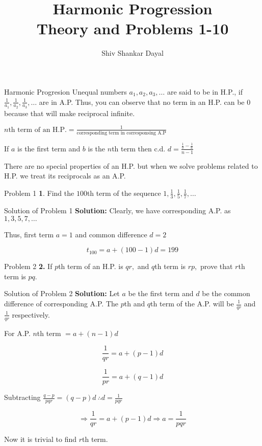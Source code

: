 \documentclass[aspectratio=1610,8pt]{beamer}
\title{Harmonic Progression\\Theory and Problems 1-10}
\author[Shiv Shankar Dayal]{Shiv Shankar Dayal}
\begin{document}
\begin{frame}
  \titlepage
\end{frame}
\begin{frame}{Harmonic Progresion}
  Unequal numbers $a_1, a_2, a_3, \ldots$ are said to be in H.P., if
  $\frac{1}{a_1}, \frac{1}{a_2}, \frac{1}{a_3}, \ldots$ are in A.P. Thus, you
  can observe that no term in an H.P. can be $0$ because that will make
  reciprocal infinite.

  $n\text{th term of an H.P.} = \frac{1}{\text{corresponding term in
      corresponsing A.P}}$

  If $a$ is the first term and $b$ is the $n$th term then c.d. $d =
  \frac{\frac{1}{b} - \frac{1}{a}}{n - 1}$

  There are no special properties of an H.P. but when we solve problems related
  to H.P. we treat its reciprocals as an A.P.
\end{frame}
\begin{frame}{Problem 1}
  \textbf{1}. Find the $100$th term of the sequence $1, \frac{1}{3},
  \frac{1}{5}, \frac{1}{7}, \ldots$
\end{frame}
\begin{frame}{Solution of Problem 1}
  \textbf{Solution:} Clearly, we have corresponding A.P. as $1, 3, 5, 7,
  \ldots$

  Thus, first term $a = 1$ and common difference $d = 2$

  $$t_{100} = a + (100 - 1)d = 199$$
\end{frame}
\begin{frame}{Problem 2}
  \textbf{2.} If $p$th term of an H.P. is $qr,$ and $q$th term is $rp,$ prove
  that $r$th term is $pq.$
\end{frame}
\begin{frame}{Solution of Problem 2}
  \textbf{Solution:} Let $a$ be the first term and $d$ be the common difference
  of corresponding A.P. The $p$th and $q$th term of the A.P. will be
  $\frac{1}{qr}$ and $\frac{1}{qr}$ respectively.

  For A.P. $n$th term $= a + (n - 1)d$

  $$\frac{1}{qr} = a + (p - 1)d$$

  $$\frac{1}{pr} = a + (q - 1)d$$

  Subtracting $\frac{q - p}{pqr} = (q - p)d~\therefore d = \frac{1}{pqr}$

  $$\Rightarrow \frac{1}{qr} = a + (p - 1)d\Rightarrow a = \frac{1}{pqr}$$

  Now it is trivial to find $r$th term.
\end{frame}
\end{document}
